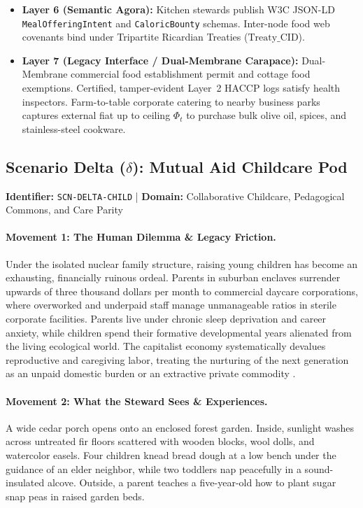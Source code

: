 \begin{itemize}
    \item \textbf{Layer 6 (Semantic Agora):} Kitchen stewards publish W3C JSON-LD \texttt{MealOfferingIntent} and \texttt{CaloricBounty} schemas. Inter-node food web covenants bind under Tripartite Ricardian Treaties ($\mathrm{Treaty\_CID}$).
    \item \textbf{Layer 7 (Legacy Interface / Dual-Membrane Carapace):} Dual-Membrane commercial food establishment permit and cottage food exemptions. Certified, tamper-evident Layer~2 HACCP logs satisfy health inspectors. Farm-to-table corporate catering to nearby business parks captures external fiat up to ceiling $\Phi_t$ to purchase bulk olive oil, spices, and stainless-steel cookware.
\end{itemize}

\subsection{Scenario Delta (\texorpdfstring{$\delta$}{Delta}): Mutual Aid Childcare Pod}
\label{subsec:scn_delta}
\textbf{Identifier:} \texttt{SCN-DELTA-CHILD} \quad | \quad \textbf{Domain:} Collaborative Childcare, Pedagogical Commons, and Care Parity

\paragraph{Movement 1: The Human Dilemma \& Legacy Friction.}
Under the isolated nuclear family structure, raising young children has become an exhausting, financially ruinous ordeal. Parents in suburban enclaves surrender upwards of three thousand dollars per month to commercial daycare corporations, where overworked and underpaid staff manage unmanageable ratios in sterile corporate facilities. Parents live under chronic sleep deprivation and career anxiety, while children spend their formative developmental years alienated from the living ecological world. The capitalist economy systematically devalues reproductive and caregiving labor, treating the nurturing of the next generation as an unpaid domestic burden or an extractive private commodity \parencite{fisher2009}.

\paragraph{Movement 2: What the Steward Sees \& Experiences.}
A wide cedar porch opens onto an enclosed forest garden. Inside, sunlight washes across untreated fir floors scattered with wooden blocks, wool dolls, and watercolor easels. Four children knead bread dough at a low bench under the guidance of an elder neighbor, while two toddlers nap peacefully in a sound-insulated alcove. Outside, a parent teaches a five-year-old how to plant sugar snap peas in raised garden beds. 


